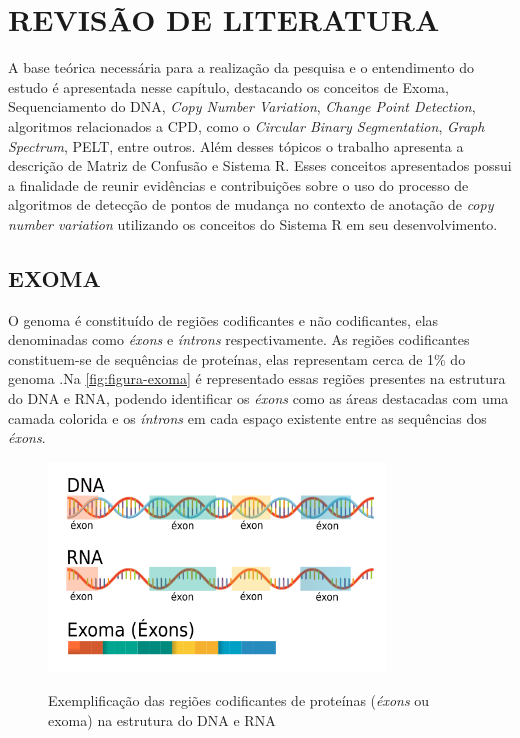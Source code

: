 
\chapter{REVISÃO DE LITERATURA}
\label{chap:fundamentacaoTeorica}

A base teórica necessária para a realização da pesquisa e o entendimento do estudo é apresentada nesse capítulo, destacando os conceitos de Exoma, Sequenciamento do DNA, \textit{Copy Number Variation}, \textit{Change Point Detection}, algoritmos relacionados a CPD, como o \textit{Circular Binary Segmentation}, \textit{Graph Spectrum}, PELT, entre outros. Além desses tópicos o trabalho apresenta a descrição de Matriz de Confusão e Sistema R. Esses conceitos apresentados possui a finalidade de reunir evidências e contribuições sobre o uso do processo de algoritmos de detecção de pontos de mudança no contexto de anotação de \textit{copy number variation} utilizando os conceitos do Sistema R em seu desenvolvimento.

\section{EXOMA}
\label{sec:exoma}

O genoma é constituído de regiões codificantes e não codificantes, elas denominadas como \textit{éxons} e \textit{íntrons} respectivamente. As regiões codificantes constituem-se de sequências de proteínas, elas representam cerca de 1\% do genoma \cite{Ng2009}.Na \autoref{fig:figura-exoma} é representado essas regiões presentes na estrutura do DNA e RNA, podendo identificar os \textit{éxons} como as áreas destacadas com uma camada colorida e os \textit{íntrons} em cada espaço existente entre as sequências dos \textit{éxons}.

\begin{figure}[!htb]
    \centering
    \caption{Exemplificação das regiões codificantes de proteínas (\textit{éxons} ou exoma) na estrutura do DNA e RNA}
    \includegraphics[width=0.8\textwidth]{./dados/figuras/exoma}
    \label{fig:figura-exoma}
\end{figure}

